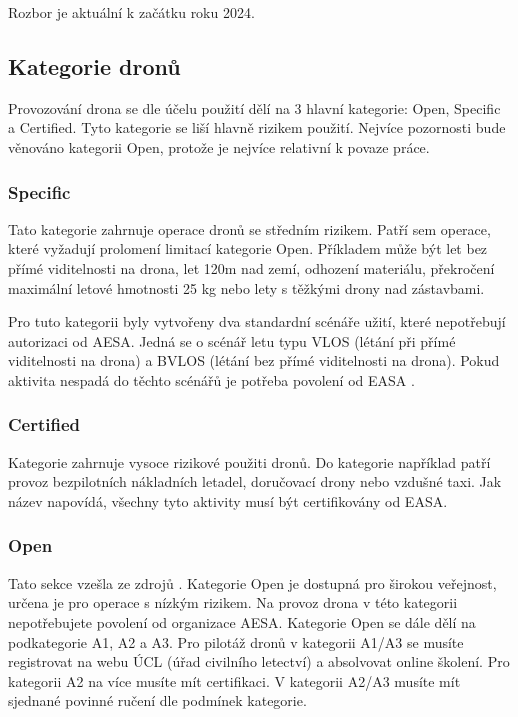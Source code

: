 Rozbor je aktuální k začátku roku 2024.

\subsection{Kategorie dronů}
Provozování drona se dle účelu použití dělí na 3 hlavní kategorie: Open, Specific a Certified. Tyto kategorie se liší hlavně rizikem použití. Nejvíce pozornosti bude věnováno kategorii Open, protože je nejvíce relativní k povaze práce.

\subsubsection{Specific}
Tato kategorie zahrnuje operace dronů se středním rizikem. Patří sem operace, které vyžadují prolomení limitací kategorie Open. Příkladem může být let bez přímé viditelnosti na drona, let 120m nad zemí, odhození materiálu, překročení maximální letové hmotnosti 25 kg nebo lety s těžkými drony nad zástavbami\cite{EASA:SpecificCategory}. 
    
Pro tuto kategorii byly vytvořeny dva standardní scénáře užití, které nepotřebují autorizaci od AESA. Jedná se o scénář letu typu VLOS (létání při přímé viditelnosti na drona) a BVLOS (létání bez přímé viditelnosti na drona). Pokud aktivita nespadá do těchto scénářů je potřeba povolení od EASA \cite{DroneKatogorySouhrn,EASA:SpecificCategory}.  
    

\subsubsection{Certified} 
Kategorie zahrnuje vysoce rizikové použiti dronů. Do kategorie například patří provoz bezpilotních nákladních letadel, doručovací drony nebo vzdušné taxi. Jak název napovídá, všechny tyto aktivity musí být certifikovány od EASA\cite{EASA:CertifiedCategory}.

\subsubsection{Open} 
Tato sekce vzešla ze zdrojů \cite{EASA:openSouhrn2024,AlzaDronyKategorie,DroneKatogorySouhrn}. Kategorie Open je dostupná pro širokou veřejnost, určena je pro operace s nízkým rizikem. Na provoz drona v této kategorii nepotřebujete povolení od organizace AESA. Kategorie Open se dále dělí na podkategorie A1, A2 a A3. Pro pilotáž dronů v kategorii A1/A3 se musíte registrovat na webu ÚCL (úřad civilního letectví) a absolvovat online školení. Pro kategorii A2 na více musíte mít certifikaci. V kategorii A2/A3 musíte mít sjednané povinné ručení dle podmínek kategorie.


